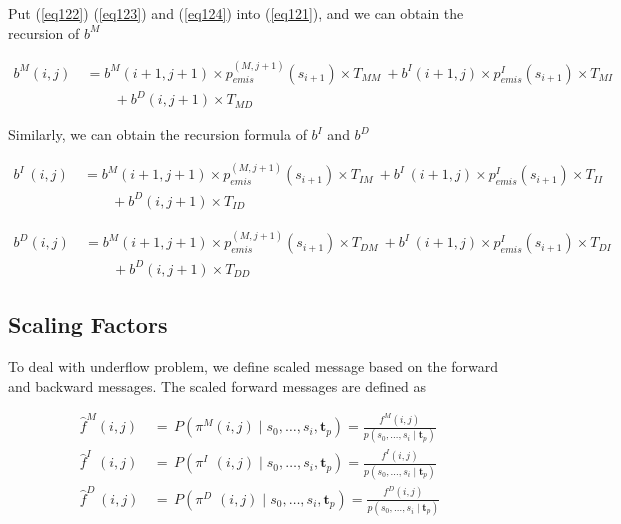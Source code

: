 \documentclass[10pt]{article}
\begin{document}
    Put (\ref{eq122}) (\ref{eq123}) and (\ref{eq124}) into (\ref{eq121}), and we can obtain the recursion of $b^{M}$

    \begin{equation} \label{eq125}
    \begin{aligned}
      b^M(i, j) \
        &= b^M(i+1, j+1) \times p_{emis}^{(M, j+1)}(s_{i+1}) \times T_{MM} \
          + b^{I}(i+1, j) \times p_{emis}^{I}(s_{i+1}) \times T_{MI} \\
          &\qquad+ b^{D}(i, j+1) \times T_{MD}
    \end{aligned}
    \end{equation}

    Similarly, we can obtain the recursion formula of $b^{I}$ and $b^{D\;}$

    \begin{equation} \label{eq126}
    \begin{aligned}
      b^{I\;}(i, j) \
        &= b^M(i+1, j+1) \times p_{emis}^{(M, j+1)}(s_{i+1}) \times T_{IM} \
          + b^{I\;}(i+1, j) \times p_{emis}^{I}(s_{i+1}) \times T_{II} \\
          &\qquad+ b^{D}(i, j+1) \times T_{ID}
    \end{aligned}
    \end{equation}

    \begin{equation}  \label{eq12}
    \begin{aligned}
      b^{D}(i, j) \
        &= b^M(i+1, j+1) \times p_{emis}^{(M, j+1)}(s_{i+1}) \times T_{DM} \
          + b^{I\;}(i+1, j) \times p_{emis}^{I}(s_{i+1}) \times T_{DI} \\
          &\qquad+ b^{D}(i, j+1) \times T_{DD}
    \end{aligned}
    \end{equation}

  \subsection{Scaling Factors}

    To deal with underflow problem, we define scaled message based on the forward and backward messages. The scaled forward messages are defined as

    \begin{equation}
    \begin{aligned}
      \widehat{f}^{M}(i, j) \,&=\, P(\pi^M(i, j) \;|\; s_0, \dots,s_{i}, \mathbf{t}_{p}) = \frac{f^{M}(i, j)}{p(s_0, \dots,s_{i} \;|\; \mathbf{t}_{p})} \\
      \widehat{f}^{I\;\;}(i, j) \,&=\, P(\pi^{I\;\;}(i, j) \;|\; s_0, \dots,s_{i}, \mathbf{t}_{p}) = \frac{f^{I}(i, j)}{p(s_0, \dots,s_{i} \;|\; \mathbf{t}_{p})}\\
      \widehat{f}^{D\;}(i, j) \,&=\, P(\pi^{D\;}\,(i, j) \;|\; s_0, \dots,s_{i}, \mathbf{t}_{p}) = \frac{f^{D}(i, j)}{p(s_0, \dots,s_{i} \;|\; \mathbf{t}_{p})}
    \end{aligned}
    \end{equation}
\end{document}
